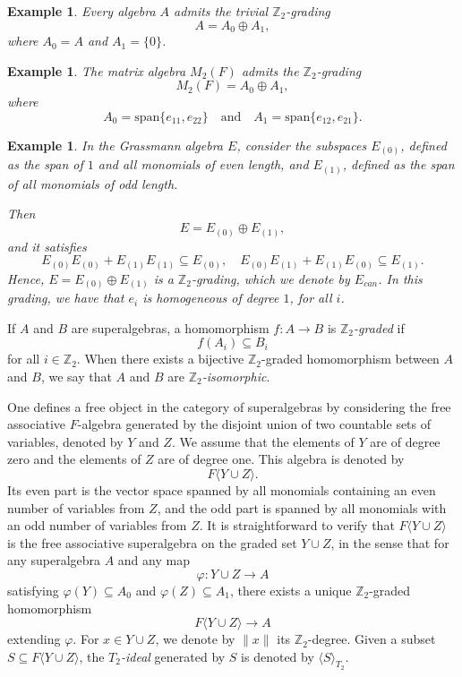 \documentclass{article}
\newtheorem{example}[theorem]{Example}
\begin{document}
	\begin{example}
		Every algebra $A$ admits the \emph{trivial} $\mathbb{Z}_2$-grading
		\[
		A = A_0 \oplus A_1,
		\]
		where $A_0 = A$ and $A_1 = \{0\}$.
	\end{example}
	
	\begin{example}
		The matrix algebra $M_2(F)$ admits the $\mathbb{Z}_2$-grading
		\[
		M_2(F) = A_0 \oplus A_1,
		\]
		where
		\[
		A_0 = \mathrm{span}\{e_{11}, e_{22}\} \quad \text{and} \quad A_1 = \mathrm{span}\{e_{12}, e_{21}\}.
		\]
	\end{example}
	
	\begin{example}
		In the Grassmann algebra $E$, consider the subspaces $E_{(0)}$, defined as the span of $1$ and all monomials of even length, and $E_{(1)}$, defined as the span of all monomials of odd length.
		
		
		Then
		\[
		E = E_{(0)} \oplus E_{(1)},
		\]
		and it satisfies
		\[
		E_{(0)} E_{(0)} + E_{(1)} E_{(1)} \subseteq E_{(0)}, \quad E_{(0)} E_{(1)} + E_{(1)} E_{(0)} \subseteq E_{(1)}.
		\]
		Hence, $E = E_{(0)} \oplus E_{(1)}$ is a $\mathbb{Z}_2$-grading, which we denote by $E_{can}$. In this grading, we have that $e_i$ is homogeneous of degree $1$, for all $i$.
	\end{example}
	
	\medskip
	
	If $A$ and $B$ are superalgebras, a homomorphism $f : A \to B$ is \emph{$\mathbb{Z}_2$-graded} if
	\[
	f(A_i) \subseteq B_i
	\]
	for all $i \in \mathbb{Z}_2$. When there exists a bijective $\mathbb{Z}_2$-graded homomorphism between $A$ and $B$, we say that $A$ and $B$ are \emph{$\mathbb{Z}_2$-isomorphic}.
	
	\medskip
	
	\noindent
	One defines a free object in the category of superalgebras by considering the free associative $F$-algebra generated by the disjoint union of two countable sets of variables, denoted by $Y$ and $Z$. We assume that the elements of $Y$ are of degree zero and the elements of $Z$ are of degree one. This algebra is denoted by
	\[
	F\langle Y \cup Z \rangle.
	\]
	Its even part is the vector space spanned by all monomials containing an even number of variables from $Z$, and the odd part is spanned by all monomials with an odd number of variables from $Z$. It is straightforward to verify that $F\langle Y \cup Z \rangle$ is the free associative superalgebra on the graded set $Y \cup Z$, in the sense that for any superalgebra $A$ and any map
	\[
	\varphi : Y \cup Z \to A
	\]
	satisfying $\varphi(Y) \subseteq A_0$ and $\varphi(Z) \subseteq A_1$, there exists a unique $\mathbb{Z}_2$-graded homomorphism
	\[
	F\langle Y \cup Z \rangle \to A
	\]
	extending $\varphi$. For $x \in Y \cup Z$, we denote by $\|x\|$ its $\mathbb{Z}_2$-degree. Given a subset $S \subseteq F\langle Y \cup Z \rangle$, the \emph{$T_2$-ideal} generated by $S$ is denoted by $\langle S \rangle_{T_2}$.
	
\end{document}
